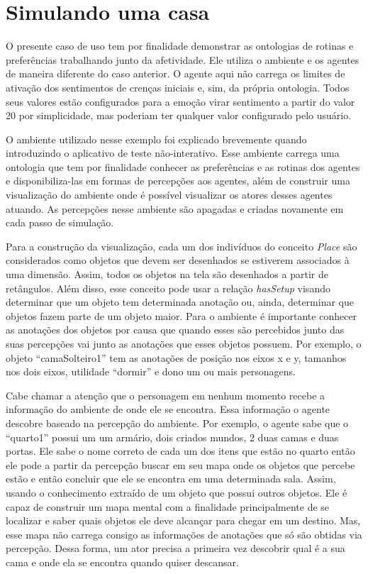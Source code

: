 \section{Simulando uma casa} \label{ch:cdu:home}

O presente caso de uso tem por finalidade demonstrar as ontologias de rotinas
e preferências trabalhando junto da afetividade. Ele utiliza o ambiente e os
agentes de maneira diferente do caso anterior. O agente aqui não carrega os
limites de ativação dos sentimentos de crenças iniciais e, sim, da própria
ontologia. Todos seus valores estão configurados para a emoção virar
sentimento a partir do valor 20\label{mark:emo} por simplicidade, mas poderiam ter qualquer
valor configurado pelo usuário.

O ambiente utilizado nesse exemplo foi explicado brevemente quando introduzindo o
aplicativo de teste não-interativo. Esse ambiente carrega uma ontologia que
tem por finalidade conhecer as preferências e as rotinas dos agentes e
disponibiliza-las em formas de percepções aos agentes, além de
construir uma visualização do ambiente onde é possível visualizar os atores
desses agentes atuando. As percepções nesse ambiente são apagadas e criadas
novamente em cada passo de simulação.

Para a construção da visualização, cada um dos indivíduos do conceito
\emph{Place} são considerados como objetos que devem ser desenhados se
estiverem associados à uma dimensão. Assim, todos os objetos na tela são
desenhados a partir de retângulos. Além disso, esse conceito pode usar a
relação \emph{hasSetup} visando determinar que um objeto tem determinada
anotação ou, ainda, determinar que objetos fazem parte de um objeto maior.
Para o ambiente é importante conhecer as anotações dos objetos por causa que
quando esses são percebidos junto das suas percepções vai junto as anotações
que esses objetos possuem. Por exemplo, o objeto ``camaSolteiro1'' tem as
anotações de posição nos eixos x e y, tamanhos nos dois eixos, utilidade
``dormir'' e dono um ou mais personagens.

Cabe chamar a atenção que o personagem em nenhum momento recebe a informação
do ambiente de onde ele se encontra. Essa informação o agente descobre baseado
na percepção do ambiente. Por exemplo, o agente sabe que o ``quarto1'' possui um
um armário, dois criados mundos, 2 duas camas e duas portas. Ele sabe o nome
correto de cada um dos itens que estão no quarto então ele pode a partir da
percepção buscar em seu mapa onde os objetos que percebe estão e então
concluir que ele se encontra em uma determinada sala. Assim, usando o
conhecimento extraído de um objeto que possui outros objetos. Ele é capaz de
construir um mapa mental com a finalidade principalmente de se localizar e
saber quais objetos ele deve alcançar para chegar em um destino. Mas, esse
mapa não carrega consigo as informações de anotações que só são obtidas via
percepção. Dessa forma, um ator precisa a primeira vez descobrir qual é a sua
cama e onde ela se encontra quando quiser descansar.

